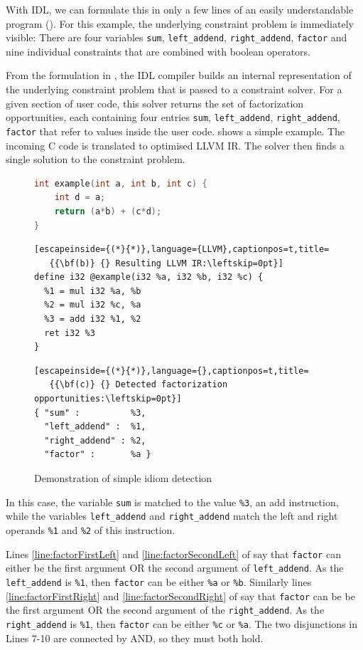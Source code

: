     With IDL, we can formulate this in only a few lines of an easily
    understandable program ().
    For this example, the underlying constraint problem is immediately visible:
    There are four variables \texttt{sum}, \texttt{left\_addend},
    \texttt{right\_addend}, \texttt{factor} and nine individual constraints
    that are combined with boolean operators.

    From the formulation in , the IDL compiler builds
    an internal representation of the underlying constraint problem that is
    passed to a constraint solver.
    For a given section of user code, this solver returns the set of
    factorization opportunities, each containing four entries
    \texttt{sum}, \texttt{left\_addend}, \texttt{right\_addend}, \texttt{factor}
    that refer to values inside the user code.
     shows a simple example.
    The incoming C code is translated to optimised LLVM IR.
    The solver then finds a single solution to the constraint problem.

\begin{figure}[ht]
\begin{lstlisting}[language={C++},captionpos=t,title=
   {{\bf(a)} {} Original C code:\leftskip=0pt}]
int example(int a, int b, int c) {
    int d = a;
    return (a*b) + (c*d);
}
\end{lstlisting}
\begin{lstlisting}[escapeinside={(*}{*)},language={LLVM},captionpos=t,title=
   {{\bf(b)} {} Resulting LLVM IR:\leftskip=0pt}]
define i32 @example(i32 %a, i32 %b, i32 %c) {
  %1 = mul i32 %a, %b
  %2 = mul i32 %c, %a
  %3 = add i32 %1, %2
  ret i32 %3
}
\end{lstlisting}
\begin{lstlisting}[escapeinside={(*}{*)},language={},captionpos=t,title=
   {{\bf(c)} {} Detected factorization opportunities:\leftskip=0pt}]
{ "sum" :          %3,
  "left_addend" :  %1,
  "right_addend" : %2,
  "factor" :       %a }
\end{lstlisting}
\caption{Demonstration of simple idiom detection}
\label{fig:firstexample}
\end{figure}

    In this case, the variable {\tt sum} is matched to the value {\tt \%3}, an
    add instruction, while the variables {\tt left\_addend} and
    {\tt right\_addend} match the left and right operands {\tt \%1} and
    {\tt \%2} of this instruction. 

    Lines \ref{line:factorFirstLeft} and \ref{line:factorSecondLeft} of
     say that {\tt factor} can either be the first
    argument OR the second argument of {\tt left\_addend}.
    As the {\tt left\_addend} is {\tt \%1}, then {\tt factor} can be either
    {\tt \%a} or {\tt \%b}.
    Similarly lines \ref{line:factorFirstRight} and
    \ref{line:factorSecondRight} of  say that
    {\tt factor} can be be the first argument OR the second argument of the
    {\tt right\_addend}.
    As the {\tt right\_addend} is {\tt \%1}, then {\tt factor} can be either
    {\tt \%c} or {\tt \%a}.
    The two disjunctions in Lines 7-10 are connected by AND, so they must both
    hold.

